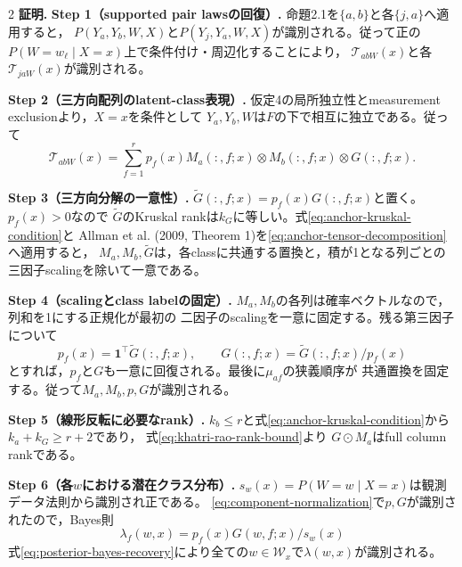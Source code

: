 \documentclass[a4paper,10pt]{article}
\newcommand{\one}{\bm 1}
\begin{document}
\begin{multicols}{2}
\noindent\textbf{証明.}
\noindent\textbf{Step 1（supported pair lawsの回復）.}
命題2.1を$\{a,b\}$と各$\{j,a\}$へ適用すると，
$P(Y_a,Y_b,W,X)$と$P(Y_j,Y_a,W,X)$が識別される。従って正の
$P(W=w_\ell\mid X=x)$上で条件付け・周辺化することにより，
$\mathcal T_{abW}(x)$と各$\mathcal T_{jaW}(x)$が識別される。

\noindent\textbf{Step 2（三方向配列のlatent-class表現）.}
仮定4の局所独立性とmeasurement exclusionより，$X=x$を条件として
$Y_a,Y_b,W$は$F$の下で相互に独立である。従って
\begin{equation}
\mathcal T_{abW}(x)
=\sum_{f=1}^r p_f(x)M_a(:,f;x)\otimes M_b(:,f;x)\otimes G(:,f;x).
\label{eq:anchor-tensor-decomposition}
\end{equation}

\noindent\textbf{Step 3（三方向分解の一意性）.}
$\widetilde G(:,f;x)=p_f(x)G(:,f;x)$と置く。$p_f(x)>0$なので
$\widetilde G$のKruskal rankは$k_G$に等しい。式\eqref{eq:anchor-kruskal-condition}と
Allman et al. (2009, Theorem 1)を\eqref{eq:anchor-tensor-decomposition}へ適用すると，
$M_a,M_b,\widetilde G$は，各classに共通する置換と，積が1となる列ごとの
三因子scalingを除いて一意である。

\noindent\textbf{Step 4（scalingとclass labelの固定）.}
$M_a,M_b$の各列は確率ベクトルなので，列和を1にする正規化が最初の
二因子のscalingを一意に固定する。残る第三因子について
\begin{equation}
p_f(x)=\one^\top\widetilde G(:,f;x),\qquad
G(:,f;x)=\widetilde G(:,f;x)/p_f(x)
\label{eq:component-normalization}
\end{equation}
とすれば，$p_f$と$G$も一意に回復される。最後に$\mu_{af}$の狭義順序が
共通置換を固定する。従って$M_a,M_b,p,G$が識別される。

\noindent\textbf{Step 5（線形反転に必要なrank）.}
$k_b\le r$と式\eqref{eq:anchor-kruskal-condition}から$k_a+k_G\ge r+2$であり，
式\eqref{eq:khatri-rao-rank-bound}より
$G\odot M_a$はfull column rankである。

\noindent\textbf{Step 6（各$w$における潜在クラス分布）.}
$s_w(x)=P(W=w\mid X=x)$は観測データ法則から識別され正である。
\eqref{eq:component-normalization}で$p,G$が識別されたので，Bayes則
\begin{equation}
\lambda_f(w,x)=p_f(x)G(w,f;x)/s_w(x)
\label{eq:posterior-bayes-recovery}
\end{equation}
式\eqref{eq:posterior-bayes-recovery}により全ての$w\in\mathcal W_x$で$\lambda(w,x)$が識別される。


\end{multicols}
\end{document}
